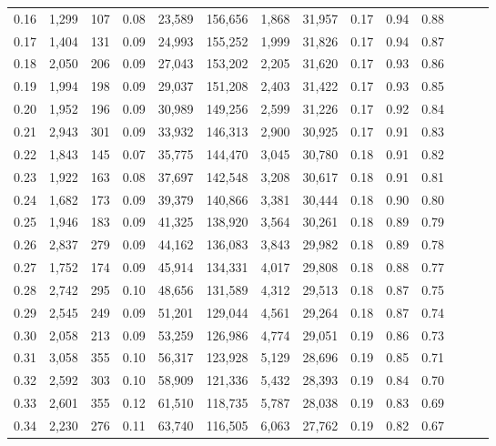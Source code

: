 \begin{tabular}{rrrrrrrrrrrrrr}
0.16 &  1,299 &  107 &  0.08 &   23,589 &  156,656 &   1,868 &  31,957 &  0.17 &  0.94 &      0.88 \\
0.17 &  1,404 &  131 &  0.09 &   24,993 &  155,252 &   1,999 &  31,826 &  0.17 &  0.94 &      0.87 \\
0.18 &  2,050 &  206 &  0.09 &   27,043 &  153,202 &   2,205 &  31,620 &  0.17 &  0.93 &      0.86 \\
0.19 &  1,994 &  198 &  0.09 &   29,037 &  151,208 &   2,403 &  31,422 &  0.17 &  0.93 &      0.85 \\
0.20 &  1,952 &  196 &  0.09 &   30,989 &  149,256 &   2,599 &  31,226 &  0.17 &  0.92 &      0.84 \\
0.21 &  2,943 &  301 &  0.09 &   33,932 &  146,313 &   2,900 &  30,925 &  0.17 &  0.91 &      0.83 \\
0.22 &  1,843 &  145 &  0.07 &   35,775 &  144,470 &   3,045 &  30,780 &  0.18 &  0.91 &      0.82 \\
0.23 &  1,922 &  163 &  0.08 &   37,697 &  142,548 &   3,208 &  30,617 &  0.18 &  0.91 &      0.81 \\
0.24 &  1,682 &  173 &  0.09 &   39,379 &  140,866 &   3,381 &  30,444 &  0.18 &  0.90 &      0.80 \\
0.25 &  1,946 &  183 &  0.09 &   41,325 &  138,920 &   3,564 &  30,261 &  0.18 &  0.89 &      0.79 \\
0.26 &  2,837 &  279 &  0.09 &   44,162 &  136,083 &   3,843 &  29,982 &  0.18 &  0.89 &      0.78 \\
0.27 &  1,752 &  174 &  0.09 &   45,914 &  134,331 &   4,017 &  29,808 &  0.18 &  0.88 &      0.77 \\
0.28 &  2,742 &  295 &  0.10 &   48,656 &  131,589 &   4,312 &  29,513 &  0.18 &  0.87 &      0.75 \\
0.29 &  2,545 &  249 &  0.09 &   51,201 &  129,044 &   4,561 &  29,264 &  0.18 &  0.87 &      0.74 \\
0.30 &  2,058 &  213 &  0.09 &   53,259 &  126,986 &   4,774 &  29,051 &  0.19 &  0.86 &      0.73 \\
0.31 &  3,058 &  355 &  0.10 &   56,317 &  123,928 &   5,129 &  28,696 &  0.19 &  0.85 &      0.71 \\
0.32 &  2,592 &  303 &  0.10 &   58,909 &  121,336 &   5,432 &  28,393 &  0.19 &  0.84 &      0.70 \\
0.33 &  2,601 &  355 &  0.12 &   61,510 &  118,735 &   5,787 &  28,038 &  0.19 &  0.83 &      0.69 \\
0.34 &  2,230 &  276 &  0.11 &   63,740 &  116,505 &   6,063 &  27,762 &  0.19 &  0.82 &      0.67 \\

\end{tabular}
